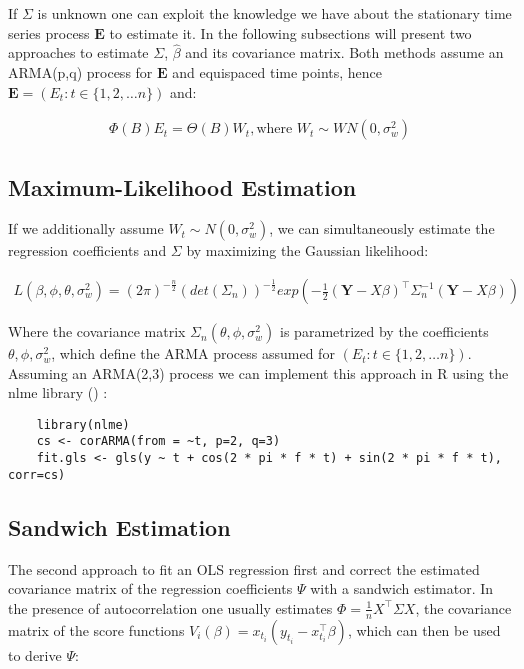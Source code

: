 If $\Sigma$ is unknown one can exploit the knowledge we have about the stationary time series process $\mathbf{E}$ to estimate it.
In the following subsections will present two approaches to estimate $\Sigma$, $\hat \beta $ and its covariance matrix.
Both methods assume an ARMA(p,q) process for $\mathbf{E}$ and equispaced time points,
hence $\mathbf{E} = (E_t: t \in \{1, 2, \dots  n \})$ and:

\begin{gather*}
    \Phi(B)E_t = \Theta(B)W_t, \text{where $W_t \sim WN(0, \sigma_w^2)$}
\end{gather*}


\subsection{Maximum-Likelihood Estimation}\label{subsec:maximum-likelihood-estimation}

If we additionally assume $W_t \sim N(0, \sigma_w^2)$, we can simultaneously estimate the regression coefficients and $\Sigma$ by
maximizing the Gaussian likelihood:

\begin{gather*}
    L(\beta, \phi, \theta, \sigma_w^2) = (2 \pi)^{-\frac{n}{2}} (det(\Sigma_n))^{-\frac{1}{2}} exp(-\frac{1}{2}
    (\mathbf{Y}-X\beta)^{\top} \Sigma_n^{-1}(\mathbf{Y}-X\beta))
\end{gather*}

Where the covariance matrix $\Sigma_n(\theta, \phi, \sigma_w^2)$ is parametrized by the coefficients $\theta, \phi, \sigma_w^2$, which
define the ARMA process assumed for $(E_t: t \in \{1, 2, \dots  n \})$.
Assuming an ARMA(2,3) process we can implement this approach in R using the nlme library (\citeauthor{box_time_1994})
:
\begin{verbatim}
    library(nlme)
    cs <- corARMA(from = ~t, p=2, q=3)
    fit.gls <- gls(y ~ t + cos(2 * pi * f * t) + sin(2 * pi * f * t), corr=cs)
\end{verbatim}


\subsection{Sandwich Estimation}
The second approach to fit an OLS regression first and correct the estimated covariance matrix of the regression coefficients $\Psi$ with a
sandwich estimator.
In the presence of autocorrelation one usually estimates $\Phi = \frac{1}{n} X^{\top} \Sigma X$,
the covariance matrix of the score functions
$V_i(\beta) = x_{t_i}(y_{t_i} - x_{t_i}^{\top}\beta)$, which can then be used to derive $\Psi$:

